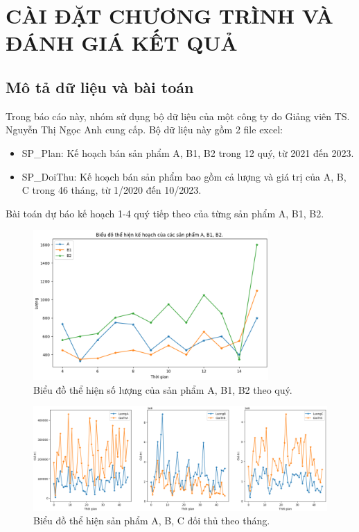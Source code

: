 \chapter{CÀI ĐẶT CHƯƠNG TRÌNH VÀ ĐÁNH GIÁ KẾT QUẢ}
\section{Mô tả dữ liệu và bài toán}
Trong báo cáo này, nhóm sử dụng bộ dữ liệu của một công ty do Giảng viên TS. Nguyễn Thị Ngọc Anh cung cấp. Bộ dữ liệu này gồm 2 file excel:
\begin{itemize}
    \item SP\_Plan: Kế hoạch bán sản phẩm A, B1, B2 trong 12 quý, từ 2021 đến 2023.
    \item SP\_DoiThu: Kế hoạch bán sản phẩm bao gồm cả lượng và giá trị của A, B, C trong 46 tháng, từ 1/2020 đến 10/2023.
\end{itemize}
Bài toán dự báo kế hoạch 1-4 quý tiếp theo của từng sản phẩm A, B1, B2.

\begin{figure}[H]
    \centering
    \includegraphics[width = 0.8\textwidth]{figure/AB1B2.png}
    \caption{Biểu đồ thể hiện số lượng của sản phẩm A, B1, B2 theo quý.}
    \label{fig:AB1B2}
\end{figure}

\begin{figure}[H]
    \centering
    \includegraphics[width = \textwidth]{figure/ABCGiaTriLuong.PNG}
    \caption{Biểu đồ thể hiện sản phẩm A, B, C đối thủ theo tháng.}
    \label{fig:ABCGiaTriLuong}
\end{figure}


